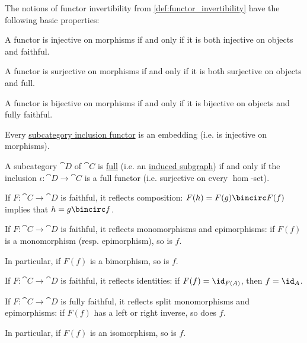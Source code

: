 \begin{proposition}\label{thm:def:functor_invertibility}
  The notions of functor invertibility from \cref{def:functor_invertibility} have the following basic properties:

  \begin{thmenum}
     A functor is injective on morphisms if and only if it is both injective on objects and faithful.

     A functor is surjective on morphisms if and only if it is both surjective on objects and full.

     A functor is bijective on morphisms if and only if it is bijective on objects and fully faithful.

     Every \hyperref[def:subcategory/inclusion]{subcategory inclusion functor} is an embedding (i.e. is injective on morphisms).

     A subcategory \( \cat{D} \) of \( \cat{C} \) is \hyperref[def:subcategory]{full} (i.e. an \hyperref[def:induced_subgraph]{induced subgraph}) if and only if the inclusion \( \iota: \cat{D} \to \cat{C} \) is a full functor (i.e. surjective on every \( \hom \)-set).

     If \( F: \cat{C} \to \cat{D} \) is faithful, it reflects composition: \( F(h) = F(g) \bincirc F(f) \) implies that \( h = g \bincirc f \).

     If \( F: \cat{C} \to \cat{D} \) is faithful, it reflects monomorphisms and epimorphisms: if \( F(f) \) is a monomorphism (resp. epimorphism), so is \( f \).

    In particular, if \( F(f) \) is a bimorphism, so is \( f \).

     If \( F: \cat{C} \to \cat{D} \) is faithful, it reflects identities: if \( F(f) = \id_{F(A)} \), then \( f = \id_A \).

     If \( F: \cat{C} \to \cat{D} \) is fully faithful, it reflects split monomorphisms and epimorphisms: if \( F(f) \) has a left or right inverse, so does \( f \).

    In particular, if \( F(f) \) is an isomorphism, so is \( f \).
  \end{thmenum}
\end{proposition}
